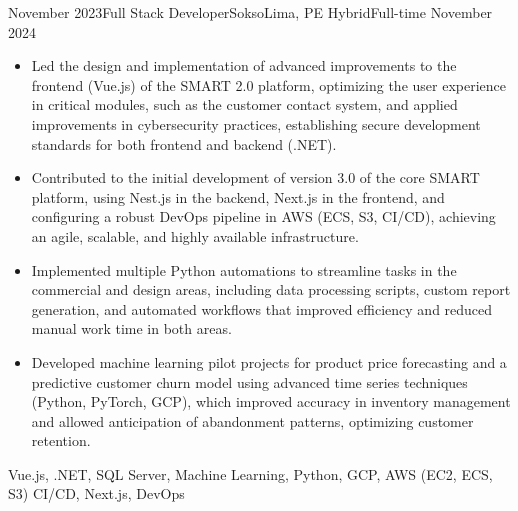 \begin{experiences}
\experience
  {November 2023}{Full Stack Developer}{Sokso}{Lima, PE}
  {Hybrid}{Full-time}
  {November 2024} {
    \begin{itemize}
      \item Led the design and implementation of advanced improvements to the frontend (Vue.js) of the SMART 2.0 platform, optimizing the user experience in critical modules, such as the customer contact system, and applied improvements in cybersecurity practices, establishing secure development standards for both frontend and backend (.NET).
      \item Contributed to the initial development of version 3.0 of the core SMART platform, using Nest.js in the backend, Next.js in the frontend, and configuring a robust DevOps pipeline in AWS (ECS, S3, CI/CD), achieving an agile, scalable, and highly available infrastructure.
      \item Implemented multiple Python automations to streamline tasks in the commercial and design areas, including data processing scripts, custom report generation, and automated workflows that improved efficiency and reduced manual work time in both areas.
      \item Developed machine learning pilot projects for product price forecasting and a predictive customer churn model using advanced time series techniques (Python, PyTorch, GCP), which improved accuracy in inventory management and allowed anticipation of abandonment patterns, optimizing customer retention.
    \end{itemize}
  }
  {Vue.js, .NET, SQL Server, Machine Learning, Python, GCP, {AWS (EC2, ECS, S3)} CI/CD, Next.js, DevOps}


\end{experiences}

